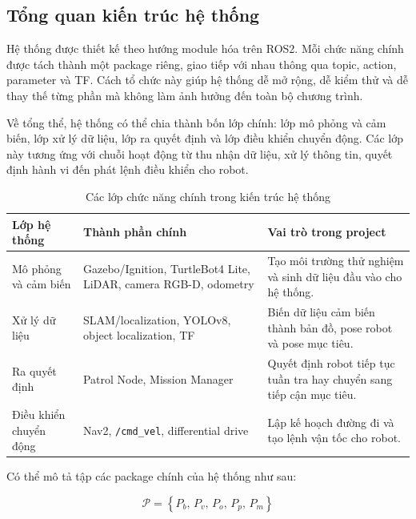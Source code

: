 \subsection{Tổng quan kiến trúc hệ thống}
\label{subsec:architecture-overview}

Hệ thống được thiết kế theo hướng module hóa trên ROS2. Mỗi chức năng chính được tách thành một package riêng, giao tiếp với nhau thông qua topic, action, parameter và TF. Cách tổ chức này giúp hệ thống dễ mở rộng, dễ kiểm thử và dễ thay thế từng phần mà không làm ảnh hưởng đến toàn bộ chương trình.

Về tổng thể, hệ thống có thể chia thành bốn lớp chính: lớp mô phỏng và cảm biến, lớp xử lý dữ liệu, lớp ra quyết định và lớp điều khiển chuyển động. Các lớp này tương ứng với chuỗi hoạt động từ thu nhận dữ liệu, xử lý thông tin, quyết định hành vi đến phát lệnh điều khiển cho robot.

\begin{table}[H]
    \centering
    \caption{Các lớp chức năng chính trong kiến trúc hệ thống}
    \label{tab:system-layers}
    \renewcommand{\arraystretch}{1.25}
    \small
    \begin{tabularx}{\textwidth}{|>{\raggedright\arraybackslash}p{}|>{\raggedright\arraybackslash}p{}|>{\raggedright\arraybackslash}X|}
        \hline
        \textbf{Lớp hệ thống} & \textbf{Thành phần chính} & \textbf{Vai trò trong project} \\
        \hline
        Mô phỏng và cảm biến & Gazebo/Ignition, TurtleBot4 Lite, LiDAR, camera RGB-D, odometry & Tạo môi trường thử nghiệm và sinh dữ liệu đầu vào cho hệ thống. \\
        \hline
        Xử lý dữ liệu & SLAM/localization, YOLOv8, object localization, TF & Biến dữ liệu cảm biến thành bản đồ, pose robot và pose mục tiêu. \\
        \hline
        Ra quyết định & Patrol Node, Mission Manager & Quyết định robot tiếp tục tuần tra hay chuyển sang tiếp cận mục tiêu. \\
        \hline
        Điều khiển chuyển động & Nav2, \texttt{/cmd\_vel}, differential drive & Lập kế hoạch đường đi và tạo lệnh vận tốc cho robot. \\
        \hline
    \end{tabularx}
\end{table}

Có thể mô tả tập các package chính của hệ thống như sau:

\begin{equation}
    \mathcal{P} = \left\{P_b,\, P_v,\, P_o,\, P_p,\, P_m\right\}
    \label{eq:package-set}
\end{equation}

